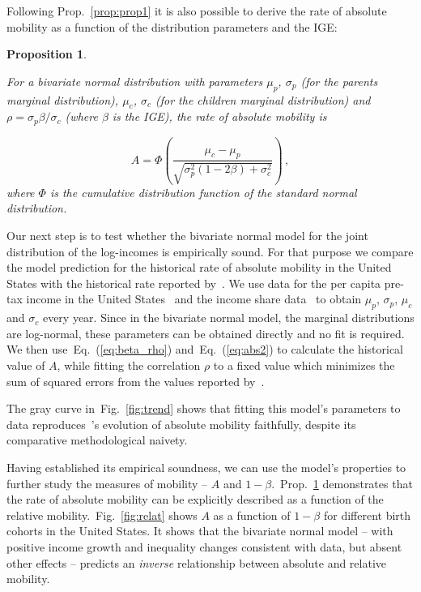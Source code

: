 \documentclass[final,10pt,5p,twocolumn,authoryear]{elsarticle}
\newtheorem{proposition}{Proposition}
\newcommand{\elabel}[1]{\label{eq:#1}}
\newcommand{\eref}[1]{Eq.~(\ref{eq:#1})}
\newcommand{\pref}[1]{Prop.~\ref{prop:#1}}
\newcommand{\fref}[1]{Fig.~\ref{fig:#1}}
\newcommand{\be}{\begin{equation}}
\newcommand{\ee}{\end{equation}}
\numberwithin{equation}{section}
\begin{document}
Following \pref{prop1} it is also possible to derive the rate of absolute mobility as a function of the distribution parameters and the IGE:

\begin{proposition}
\label{prop:prop2}

For a bivariate normal distribution with parameters $\mu_p$, $\sigma_p$ (for the parents marginal distribution), $\mu_c$, $\sigma_c$ (for the children marginal distribution) and $\rho=\sigma_p\beta/\sigma_c$ (where $\beta$ is the IGE), the rate of absolute mobility is

\be
A = \Phi\left(\frac{\mu_c - \mu_p}{\sqrt{\sigma_p^2\left(1 - 2\beta\right) + \sigma_c^2}}\right) \,,
\elabel{abs2}
\ee
where $\Phi$ is the cumulative distribution function of the standard normal distribution.
\end{proposition}

Our next step is to test whether the bivariate normal model for the joint distribution of the log-incomes is empirically sound. For that purpose we compare the model prediction for the historical rate of absolute mobility in the United States with the historical rate reported by~\citet{chetty2017fading}. We use data for the per capita pre-tax income in the United States~\citep{PikettyZucman2014} and the income share data~\citep{WID2017} to obtain $\mu_p$, $\sigma_p$, $\mu_c$ and $\sigma_c$ every year. Since in the bivariate normal model, the marginal distributions are log-normal, these parameters can be obtained directly and no fit is required. We then use~\eref{beta_rho} and~\eref{abs2} to calculate the historical value of $A$, while fitting the correlation $\rho$ to a fixed value which minimizes the sum of squared errors from the values reported by~\citet{chetty2017fading}.

The gray curve in~\fref{trend} shows that fitting this model's parameters to data reproduces~\citet{chetty2017fading}'s evolution of absolute mobility faithfully, despite its comparative methodological naivety.

Having established its empirical soundness, we can use the model's properties to further study the measures of mobility -- $A$ and $1-\beta$.~\pref{prop2} demonstrates that the rate of absolute mobility can be explicitly described as a function of the relative mobility.~\fref{relat} shows $A$ as a function of $1-\beta$ for different birth cohorts in the United States. It shows that the bivariate normal model -- with positive income growth and inequality changes consistent with data, but absent other effects -- predicts an \textit{inverse} relationship between absolute and relative mobility.
\end{document}
